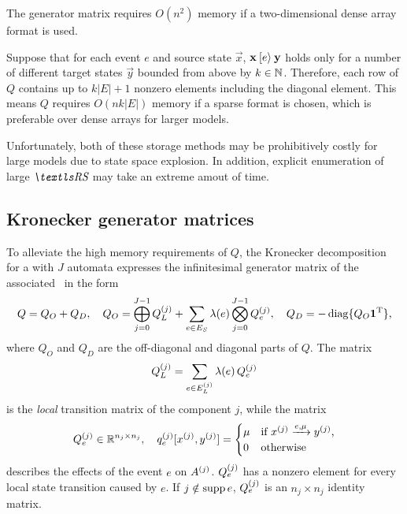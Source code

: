 The generator matrix requires $O(n^2)$ memory if a two-dimensional
dense array format is used.

Suppose that for each event $e$ and source state $\vec{x}$,
$\bm{\mathrm{x}} \mathbin{[e\rangle} \bm{\mathrm{y}}$ holds only for a number of different
target states $\vec{y}$ bounded from above by $k \in \mathbb{N}$. Therefore,
each row of $Q$ contains up to $k \lvert E \rvert + 1$ nonzero
elements including the diagonal element. This means $Q$ requires
$O(n k \lvert E \rvert)$ memory if a sparse format is chosen, which is
preferable over dense arrays for larger models.

Unfortunately, both of these storage methods may be prohibitively
costly for large models due to state space explosion. In addition,
explicit enumeration of large $\RS$ may take an extreme amout of time.

\subsection{Kronecker generator matrices}

To alleviate the high memory requirements of $Q$, the Kronecker
decomposition for a  with $J$ automata expresses the
infinitesimal generator matrix of the associated \CTMC\ in the form
\begin{equation}
  \label{eq:genstor:explicit:kronecker}
  Q = Q_O + Q_D, \quad Q_O = \bigoplus_{j = 0}^{J - 1} Q_L^{(j)}
  + \sum_{e \in E_S} \lambda(e) \bigotimes_{j = 0}^{J - 1}
  Q_{e}^{(j)}, \quad Q_D = -\operatorname{diag} \{ Q_O \bm{\mathrm{1}}^{\mathrm{T}} \} \text,
\end{equation}
where $Q_O$ and $Q_D$ are the off-diagonal and diagonal parts of
$Q$. The matrix
\begin{equation}
  Q_L^{(j)} = \sum_{e \in E_L^{(j)}} \lambda(e) \, Q_e^{(j)}
\end{equation}
is the \emph{local} transition matrix of the component $j$, while
the matrix
\begin{equation}
  Q_e^{(j)} \in \mathbb{R}^{n_j \times n_j}, \quad
  q_e^{(j)}[x^{(j)},y^{(j)}] = \begin{cases}
    \mu & \text{if $x^{(j)} \xrightarrow{e, \mu} y^{(j)}$,} \\
    0 & \text{otherwise}
  \end{cases}
\end{equation}
describes the effects of the event $e$ on $A^{(j)}$. $Q_e^{(j)}$
has a nonzero element for every local state transition caused by
$e$. If $j \notin \operatorname{supp} e$, $Q_e^{(j)}$ is an $n_j \times n_j$
identity matrix.

